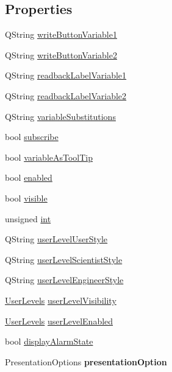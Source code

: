 \subsection*{Properties}
\begin{DoxyCompactItemize}
\item 
QString \hyperlink{classQEPeriodic_a39ccfb959ab6a662a0b2e70be6be1ba7}{writeButtonVariable1}
\item 
QString \hyperlink{classQEPeriodic_a8e9f3750f759bd05031b4be4285c49d8}{writeButtonVariable2}
\item 
QString \hyperlink{classQEPeriodic_a17db6aede735b5456c486f36377efb51}{readbackLabelVariable1}
\item 
QString \hyperlink{classQEPeriodic_ae191db70db9660bc253126a7b33d1f76}{readbackLabelVariable2}
\item 
QString \hyperlink{classQEPeriodic_ad7cb653148f609d8932636b4430d75bb}{variableSubstitutions}
\item 
bool \hyperlink{classQEPeriodic_aa066c1f6f40a4cca7b822371a332f013}{subscribe}
\item 
bool \hyperlink{classQEPeriodic_a9145a9978f353143f53559816a2232f8}{variableAsToolTip}
\item 
bool \hyperlink{classQEPeriodic_a3eb08b1082d27b46ee418415ed42affb}{enabled}
\item 
bool \hyperlink{classQEPeriodic_a928f00366d141ce588ab39372c785c9f}{visible}
\item 
unsigned \hyperlink{classQEPeriodic_afe194e700529c05bc2482bd5d80dd462}{int}
\item 
QString \hyperlink{classQEPeriodic_affb5eb56ea86898efa83f0491228e77c}{userLevelUserStyle}
\item 
QString \hyperlink{classQEPeriodic_a91a128c6ede1d9d392d1ab68e2499f77}{userLevelScientistStyle}
\item 
QString \hyperlink{classQEPeriodic_a5d5e9b1229dc86c1ddaa10a5147737f7}{userLevelEngineerStyle}
\item 
\hyperlink{classQEPeriodic_a24429d342ac647985717bc5cb6a3d912}{UserLevels} \hyperlink{classQEPeriodic_ac0f4016896d8c021a28bfa34586f35ab}{userLevelVisibility}
\item 
\hyperlink{classQEPeriodic_a24429d342ac647985717bc5cb6a3d912}{UserLevels} \hyperlink{classQEPeriodic_a0de902aca11667feca3158fa74be789f}{userLevelEnabled}
\item 
bool \hyperlink{classQEPeriodic_aa60b7e5faa9103d2b7df5bff9bf442f2}{displayAlarmState}
\item 
\hypertarget{classQEPeriodic_a4de17e539a8392c2f1618ffdecbc61bd}{
PresentationOptions {\bfseries presentationOption}}
\label{classQEPeriodic_a4de17e539a8392c2f1618ffdecbc61bd}


\end{DoxyCompactItemize}
